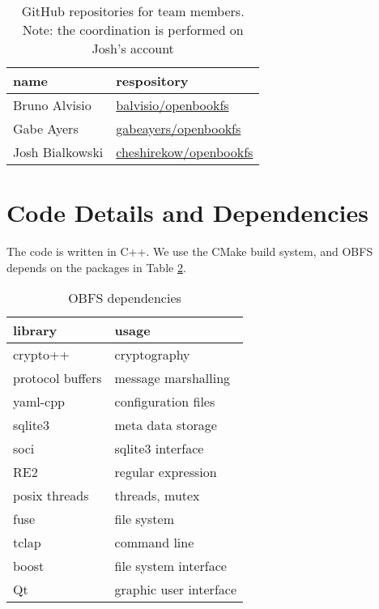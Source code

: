 \documentclass[10pt,twocolumn]{article}
\begin{document}
\begin{table}
    \centering
    \begin{tabular}{l|l}
        \textbf{name}     &  \textbf{respository}    \\ \hline
        Bruno Alvisio     &  \url{balvisio/openbookfs}    \\
        Gabe  Ayers       &  \url{gabeayers/openbookfs}   \\
        Josh  Bialkowski  &  \url{cheshirekow/openbookfs} \\
    \end{tabular}
    \caption{GitHub repositories for team members. Note: the coordination is 
             performed on Josh's account}
    \label{tbl:github}
\end{table}


\section{Code Details and Dependencies}

The code is written in C++. We use the CMake build system, and OBFS depends on
the packages in Table \ref{tbl:dependencies}.


\begin{table}[h]
    \centering
    \begin{tabular}{l|l}
      \textbf{library} & \textbf{usage} \\ \hline
      crypto++          & cryptography        \\
      protocol buffers  & message marshalling \\
      yaml-cpp          & configuration files \\
      sqlite3           & meta data storage   \\
      soci              & sqlite3 interface   \\
      RE2               & regular expression  \\
      posix threads     & threads, mutex      \\
      fuse              & file system         \\
      tclap             & command line        \\
      boost             & file system interface\\ 
     Qt		    & graphic user interface
    \end{tabular}
    \caption{OBFS dependencies}
    \label{tbl:dependencies}
\end{table}
\end{document}
